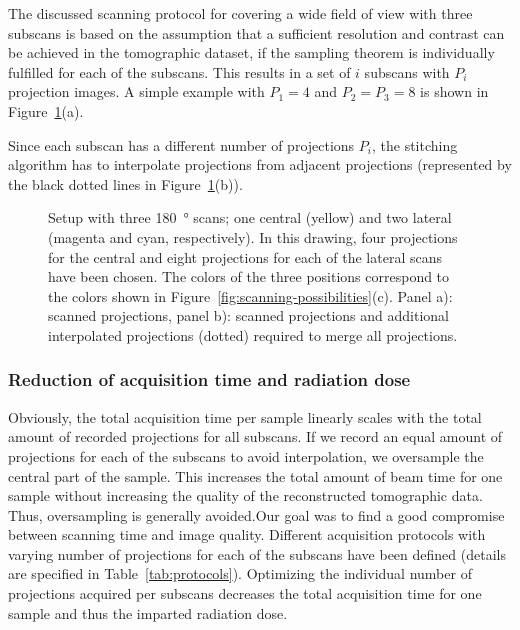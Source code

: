 The discussed scanning protocol for covering a wide field of view with three subscans is based on the assumption that a sufficient resolution and contrast can be achieved in the tomographic dataset, if the sampling theorem is individually fulfilled for each of the subscans. This results in a set of $i$ subscans with $P_{i}$ projection images. A simple example with $P_{1}=4$ and $P_{2}=P_{3}=8$ is shown in Figure~\ref{fig:projections}(a).

\cbdelete Since each subscan has a different number of projections $P_{i}$, the stitching algorithm has to interpolate projections from adjacent projections (represented by the black dotted lines in Figure~\ref{fig:projections}(b)).\cbdelete

\begin{figure}
	\centering
	\caption{Setup with three \SI{180}{\degree} scans; one central (yellow) and two lateral (magenta and cyan, respectively). In this drawing, four projections for the central and eight projections for each of the lateral scans have been chosen. The colors of the three positions correspond to the colors shown in Figure~\ref{fig:scanning-possibilities}(c). Panel a): scanned projections, panel b): scanned projections and additional interpolated projections (dotted) required to merge all projections.}
	\ifiucr
		
	\else
	\fi
	\label{fig:projections}
\end{figure}

\subsubsection{Reduction of acquisition time and radiation dose}
\label{subsubsec:reduction-of-acquisition-time}
\cbstart Obviously, the total acquisition time per sample linearly scales with the total amount of recorded projections for all subscans. If we record an equal amount of projections for each of the subscans to avoid interpolation, we oversample the central part of the sample. This increases the total amount of beam time for one sample without increasing the quality of the reconstructed tomographic data. Thus, oversampling is generally avoided.\cbend Our goal was to find a good compromise between scanning time and image quality.
\cbstart 
Different acquisition protocols with varying number of projections for each of the subscans have been defined (details are specified in Table~\ref{tab:protocols}). Optimizing the individual number of projections acquired per subscans decreases the total acquisition time for one sample and thus the imparted radiation dose.
\cbend

